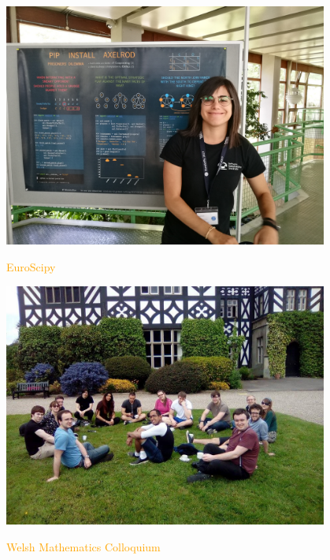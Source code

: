 \documentclass{beamer}
\begin{document}
\begin{frame}
    \begin{center}
        \includegraphics[width=0.8\textwidth]{static/euroscipy.jpg}

        \textcolor{orange}{EuroScipy}
    \end{center}
\end{frame}

\begin{frame}
    \begin{center}
        \includegraphics[width=0.8\textwidth]{static/grey.jpg}

        \textcolor{orange}{Welsh Mathematics Colloquium}
    \end{center}
\end{frame}
\end{document}
